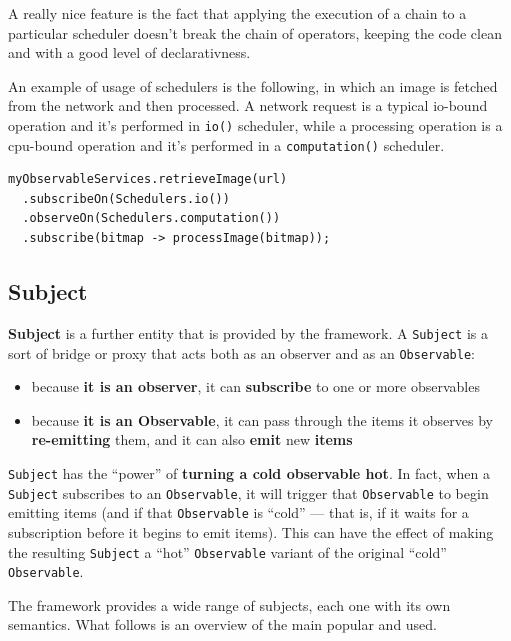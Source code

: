 A really nice feature is the fact that applying the execution of a chain
to a particular scheduler doesn't break the chain of operators, keeping
the code clean and with a good level of declarativness.

An example of usage of schedulers is the following, in which an image is
fetched from the network and then processed. A network request is a
typical io-bound operation and it's performed in \texttt{io()}
scheduler, while a processing operation is a cpu-bound operation and
it's performed in a \texttt{computation()} scheduler.

\begin{verbatim}
myObservableServices.retrieveImage(url)
  .subscribeOn(Schedulers.io())
  .observeOn(Schedulers.computation())
  .subscribe(bitmap -> processImage(bitmap));
\end{verbatim}


\subsection{Subject}\label{subject}

\textbf{Subject} is a further entity that is provided by the framework.
A \texttt{Subject} is a sort of bridge or proxy that acts both as an
observer and as an \texttt{Observable}:

\begin{itemize}
\itemsep1pt\parskip0pt
\item
  because \textbf{it is an observer}, it can \textbf{subscribe} to one
  or more observables
\item
  because \textbf{it is an Observable}, it can pass through the items it
  observes by \textbf{re-emitting} them, and it can also \textbf{emit}
  new \textbf{items}
\end{itemize}

\texttt{Subject} has the ``power'' of \textbf{turning a cold observable
hot}. In fact, when a \texttt{Subject} subscribes to an
\texttt{Observable}, it will trigger that \texttt{Observable} to begin
emitting items (and if that \texttt{Observable} is ``cold'' --- that is,
if it waits for a subscription before it begins to emit items). This can
have the effect of making the resulting \texttt{Subject} a ``hot''
\texttt{Observable} variant of the original ``cold''
\texttt{Observable}.

The framework provides a wide range of subjects, each one with its own
semantics. What follows is an overview of the main popular and used.

